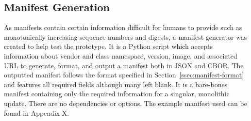 \documentclass[0-thesis.tex]{subfiles}
\begin{document}
\subsection{Manifest Generation}
As manifests contain certain information difficult for humans to provide such as
monotonically increasing sequence numbers and digests, a manifest generator was created to
help test the prototype. It is a Python script which accepts information about vendor and
class namespace, version, image, and associated URL to generate, format, and output a
manifest both in JSON and CBOR. The outputted manifest follows the format specified in
Section~\ref{ssec:manifest-format} and features all required fields although many left
blank. It is a bare-bones manifest containing only the required information for a
singular, monolithic update. There are no dependencies or options. The example manifest
used can be found in Appendix X. %
\end{document}
